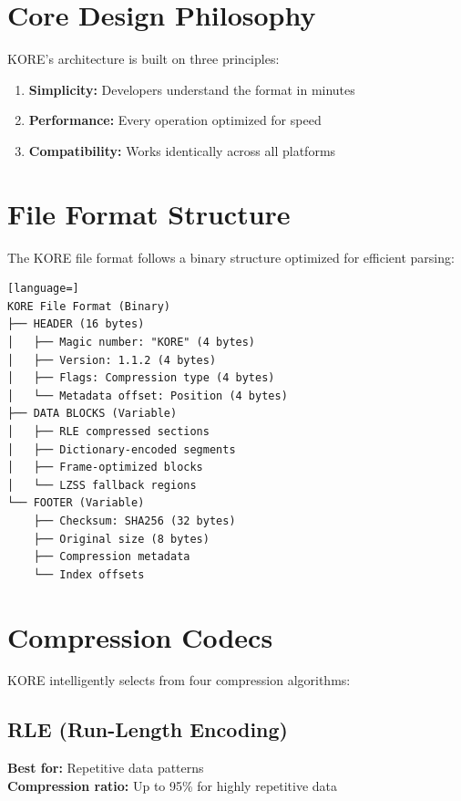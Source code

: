 \documentclass[12pt,a4paper]{report}
\begin{document}
\section{Core Design Philosophy}

KORE's architecture is built on three principles:

\begin{enumerate}
    \item \textbf{Simplicity:} Developers understand the format in minutes
    \item \textbf{Performance:} Every operation optimized for speed
    \item \textbf{Compatibility:} Works identically across all platforms
\end{enumerate}

\section{File Format Structure}

The KORE file format follows a binary structure optimized for efficient parsing:

\begin{lstlisting}[language=]
KORE File Format (Binary)
├── HEADER (16 bytes)
│   ├── Magic number: "KORE" (4 bytes)
│   ├── Version: 1.1.2 (4 bytes)
│   ├── Flags: Compression type (4 bytes)
│   └── Metadata offset: Position (4 bytes)
├── DATA BLOCKS (Variable)
│   ├── RLE compressed sections
│   ├── Dictionary-encoded segments
│   ├── Frame-optimized blocks
│   └── LZSS fallback regions
└── FOOTER (Variable)
    ├── Checksum: SHA256 (32 bytes)
    ├── Original size (8 bytes)
    ├── Compression metadata
    └── Index offsets
\end{lstlisting}

\section{Compression Codecs}

KORE intelligently selects from four compression algorithms:

\subsection{RLE (Run-Length Encoding)}

\textbf{Best for:} Repetitive data patterns \\
\textbf{Compression ratio:} Up to 95\% for highly repetitive data
\end{document}
